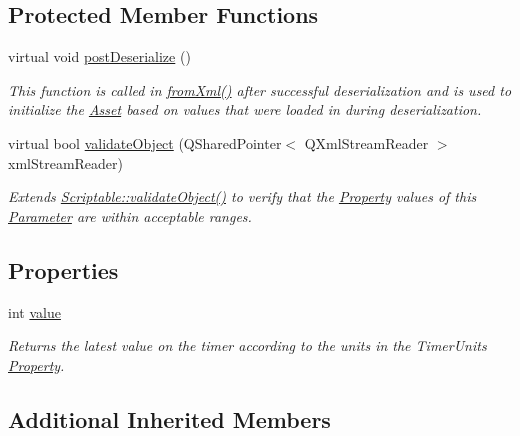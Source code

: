 \subsection*{Protected Member Functions}
\begin{DoxyCompactItemize}
\item 
virtual void \hyperlink{class_picto_1_1_timer_parameter_a927a09a69a33a95beccfe2c1132ba6f2}{post\-Deserialize} ()
\begin{DoxyCompactList}\small\item\em This function is called in \hyperlink{class_picto_1_1_asset_a8bed4da09ecb1c07ce0dab313a9aba67}{from\-Xml()} after successful deserialization and is used to initialize the \hyperlink{class_picto_1_1_asset}{Asset} based on values that were loaded in during deserialization. \end{DoxyCompactList}\item 
virtual bool \hyperlink{class_picto_1_1_timer_parameter_ad55dd12854d49e9c2d4eb4bd5c706e36}{validate\-Object} (Q\-Shared\-Pointer$<$ Q\-Xml\-Stream\-Reader $>$ xml\-Stream\-Reader)
\begin{DoxyCompactList}\small\item\em Extends \hyperlink{class_picto_1_1_scriptable_ab6e2944c43a3b5d418bf7b251594386d}{Scriptable\-::validate\-Object()} to verify that the \hyperlink{class_picto_1_1_property}{Property} values of this \hyperlink{class_picto_1_1_parameter}{Parameter} are within acceptable ranges. \end{DoxyCompactList}\end{DoxyCompactItemize}
\subsection*{Properties}
\begin{DoxyCompactItemize}
\item 
int \hyperlink{class_picto_1_1_timer_parameter_a2742cc0d9e28ee54c8159add6e58c3b6}{value}
\begin{DoxyCompactList}\small\item\em Returns the latest value on the timer according to the units in the Timer\-Units \hyperlink{class_picto_1_1_property}{Property}. \end{DoxyCompactList}\end{DoxyCompactItemize}
\subsection*{Additional Inherited Members}


